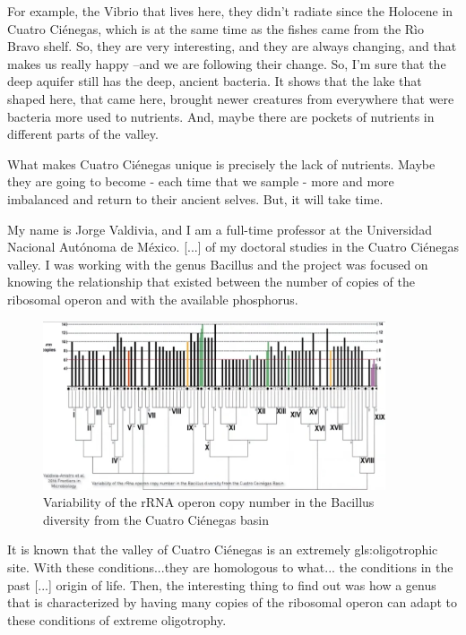 \documentclass[]{article}
\begin{document}
For example, the Vibrio that lives here, they didn't radiate since the Holocene in Cuatro  Ci\'enegas, which is at the same time as the fishes came from the R\`io Bravo shelf. So, they are very interesting, and they are always changing, and that makes us really happy --and we are following their change. So, I'm sure that the deep aquifer still has the deep, ancient bacteria. It shows that the lake that shaped here, that came here, brought newer creatures from everywhere that were bacteria more used to nutrients. And, maybe there are pockets of nutrients in different parts of the valley.

What makes Cuatro  Ci\'enegas unique is precisely the lack of nutrients. Maybe they are going to become - each time that we sample - more and more imbalanced and return to their ancient selves. But, it will take time.

My name is Jorge Valdivia, and I am a full-time professor at the Universidad Nacional Aut\'onoma de M\'exico. [...] of my doctoral studies in the Cuatro  Ci\'enegas valley. I was working with the genus Bacillus and the project was focused on knowing the relationship that existed between the number of copies of the ribosomal operon and with the available phosphorus.\cite{valdivia2016variability}
\begin{figure}[h!]
	\caption{Variability of the rRNA operon copy number in the Bacillus diversity from the Cuatro  Ci\'enegas basin} 
	\includegraphics[width=0.9\textwidth]{CuatroCienegas8}
\end{figure}

It is known that the valley of Cuatro  Ci\'enegas is an extremely \gls{gls:oligotroph}ic site. With these conditions...they are homologous to what... the conditions in the past [...] origin of life. Then, the interesting thing to find out was how a genus that is characterized by having many copies of the ribosomal operon can adapt to these conditions of extreme oligotrophy.
\end{document}
